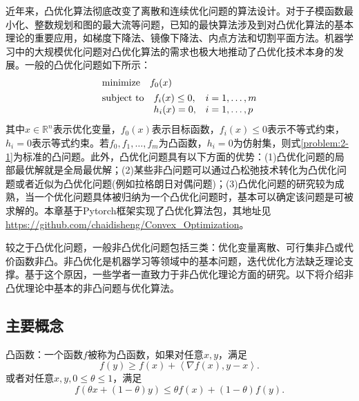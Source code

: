 近年来，凸优化算法彻底改变了离散和连续优化问题的算法设计。对于子模函数最小化、整数规划和图的最大流等问题，已知的最快算法涉及到对凸优化算法的基本理论的重要应用，如梯度下降法、镜像下降法、内点方法和切割平面方法\supercite{Stephen1,Stephen2,Stephen3,Goldstein,Heide,Thomas,Chambolle1,Martin}。机器学习中的大规模优化问题对凸优化算法的需求也极大地推动了凸优化技术本身的发展。一般的凸优化问题如下所示：
\begin{equation} \label{problem:2-1}
	\begin{aligned}
		&\text{minimize}\quad f_{0}(x) \\
		&\begin{array}{@{}l@{\quad}l@{\quad}l@{}}
			\text{subject\ to}
			&f_{i}(x)\leq 0, &i=1,\ldots,m \\
			&h_{i}(x)=0, &i=1,\ldots,p \\
		\end{array}
	\end{aligned}
\end{equation}
其中$x\in\mathbb{R}^n$表示优化变量，$f_{0}(x)$表示目标函数，$f_{i}(x)\leq{0}$表示不等式约束，$h_{i}=0$表示等式约束。若$f_{0},f_{1},\ldots,f_{m}$为凸函数，$h_{i}=0$为仿射集，则式\eqref{problem:2-1}为标准的凸问题。此外，凸优化问题具有以下方面的优势：(1)凸优化问题的局部最优解就是全局最优解；(2)某些非凸问题可以通过凸松弛技术转化为凸优化问题或者近似为凸优化问题(例如拉格朗日对偶问题)；(3)凸优化问题的研究较为成熟，当一个优化问题具体被归纳为一个凸优化问题时，基本可以确定该问题是可被求解的。本章基于Pytorch框架实现了凸优化算法包，其地址见\url{https://github.com/chaidisheng/Convex_Optimization}。

较之于凸优化问题，一般非凸优化问题包括三类：优化变量离散、可行集非凸或代价函数非凸\supercite{Chambolle2,Andreas,Xu,Fengmiao,PanShaohua,SunTao}。非凸优化是机器学习等领域中的基本问题，迭代优化方法缺乏理论支撑\supercite{PanShaohua, SunTao}。基于这个原因，一些学者一直致力于非凸优化理论方面的研究\supercite{SunTao,Chi,Liu,Ruoyu,Cong,Xiangyi,Danilova,Dongruo}。以下将介绍非凸优理论中基本的非凸问题与优化算法。
\subsection{主要概念}
\begin{definition} \label{def:2.1}
	凸函数：一个函数$f$被称为凸函数，如果对任意$x,y$，满足
	\begin{equation} 
		f(y)\geq{f(x)+\left\langle{\nabla f(x), y-x}\right\rangle}.
	\end{equation}
	或者对任意$x,y,0\leq\theta\leq1$，满足
	\begin{equation} 
		f(\theta x + (1-\theta)y)\leq\theta f(x)+(1-\theta)f(y).
	\end{equation}
\end{definition}

